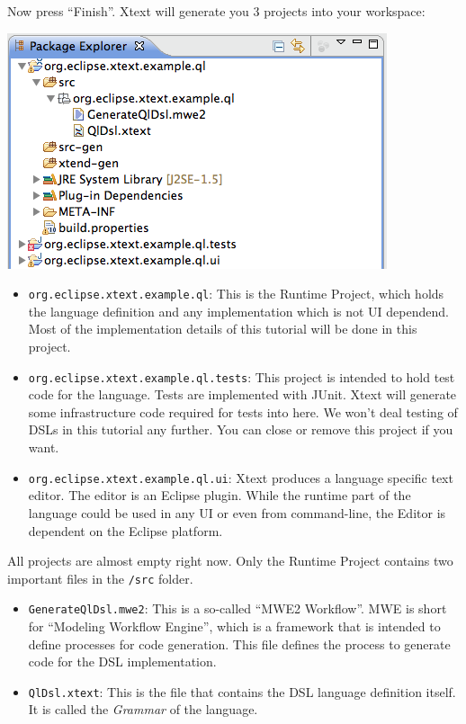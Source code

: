 Now press ``Finish''. Xtext will generate you 3 projects into your workspace:

\includegraphics{./images/chapter01/WorkspaceAfterWizard.png}

\begin{itemize}
  \item \texttt{org.eclipse.xtext.example.ql}: This is the Runtime Project,
  which holds the language definition and any implementation which is not UI
  dependend. Most of the implementation details of this tutorial will be done in
  this project.
  \item \texttt{org.eclipse.xtext.example.ql.tests}: This project is intended to
  hold test code for the language. Tests are implemented with JUnit. Xtext will
  generate some infrastructure code required for tests into here. We won't deal
  testing of DSLs in this tutorial any further. You can close or remove this
  project if you want.
  \item \texttt{org.eclipse.xtext.example.ql.ui}: Xtext produces a language
  specific text editor. The editor is an Eclipse plugin. While the runtime part
  of the language could be used in any UI or even from command-line, the Editor
  is dependent on the Eclipse platform.
\end{itemize}

All projects are almost empty right now. Only the Runtime Project contains two
important files in the \texttt{/src} folder.
\begin{itemize}
  \item \texttt{GenerateQlDsl.mwe2}: This is a so-called ``MWE2 Workflow''. MWE
  is short for ``Modeling Workflow Engine'', which is a framework that is
  intended to define processes for code generation. This file defines the
  process to generate code for the DSL implementation.
  \item \texttt{QlDsl.xtext}: This is the file that contains the DSL language
  definition itself. It is called the \emph{Grammar} of the language.
\end{itemize}

